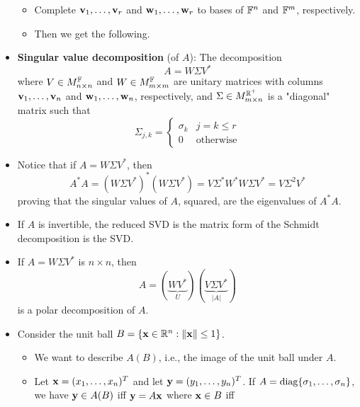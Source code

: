 \documentclass[../../notes.tex]{subfiles}
\begin{document}
\begin{itemize}
    \begin{itemize}
        \item Complete $\mathbf{v}_1,\dots,\mathbf{v}_r$ and $\mathbf{w}_1,\dots,\mathbf{w}_r$ to bases of $\mathbb{F}^n$ and $\mathbb{F}^m$, respectively.
        \item Then we get the following.
    \end{itemize}
    \item \textbf{Singular value decomposition} (of $A$): The decomposition
    \begin{equation*}
        A = W\Sigma V^*
    \end{equation*}
    where $V\in M_{n\times n}^{\mathbb{F}}$ and $W\in M_{m\times m}^{\mathbb{F}}$ are unitary matrices with columns $\mathbf{v}_1,\dots,\mathbf{v}_n$ and $\mathbf{w}_1,\dots,\mathbf{w}_n$, respectively, and $\Sigma\in M_{m\times n}^{\mathbb{R}^+}$ is a "diagonal" matrix such that
    \begin{equation*}
        \Sigma_{j,k} =
        \begin{cases}
            \sigma_k & j=k\leq r\\
            0 & \text{otherwise}
        \end{cases}
    \end{equation*}
    \item Notice that if $A=W\Sigma V^*$, then
    \begin{equation*}
        A^*A = (W\Sigma V^*)^*(W\Sigma V^*) = V\Sigma^*W^*W\Sigma V^* = V\Sigma^2V^*
    \end{equation*}
    proving that the singular values of $A$, squared, are the eigenvalues of $A^*A$.
    \item If $A$ is invertible, the reduced SVD is the matrix form of the Schmidt decomposition is the SVD.
    \item If $A=W\Sigma V^*$ is $n\times n$, then
    \begin{equation*}
        A = (\underbrace{WV^*}_U)(\underbrace{V\Sigma V^*}_{|A|})
    \end{equation*}
    is a polar decomposition of $A$.
    \item Consider the unit ball $B=\{\mathbf{x}\in\mathbb{R}^n:\norm{\mathbf{x}}\leq 1\}$.
    \begin{itemize}
        \item We want to describe $A(B)$, i.e., the image of the unit ball under $A$.
        \item Let $\mathbf{x}=(x_1,\dots,x_n)^T$ and let $\mathbf{y}=(y_1,\dots,y_n)^T$. If $A=\operatorname{diag}\{\sigma_1,\dots,\sigma_n\}$, we have $\mathbf{y}\in A(B)$ iff $\mathbf{y}=A\mathbf{x}$ where $\mathbf{x}\in B$ iff
        \begin{equation*}

\end{equation*}
\end{itemize}
\end{itemize}
\end{document}
